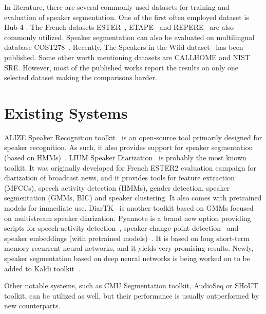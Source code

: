 \documentclass[FM,noheader,EN,bwtitles]{tulthesis}
\begin{document}
In literature, there are several commonly used datasets for training and evaluation of speaker segmentation.
One of the first often employed dataset is Hub-4 \parencite{hub-4}.
The French datasets ESTER~\parencite{DBLP:conf/lrec/GallianoGGBMC06}, ETAPE~\parencite{DBLP:conf/lrec/GalibertLACG14} and REPERE~\parencite{DBLP:conf/interspeech/Galibert13} are also commonly utilized.
Speaker segmentation can also be evaluated on multilingual database COST278~\parencite{DBLP:conf/interspeech/ZibertMMMNFGDZPCZKTV05}.
Recently, The Speakers in the Wild dataset~\parencite{DBLP:conf/interspeech/McLarenFCL16} has been published.
Some other worth mentioning datasets are CALLHOME and NIST SRE.
However, most of the published works report the results on only one selected dataset making the comparisons harder.

\section{Existing Systems}
\label{s:existingSystems}

ALIZE Speaker Recognition toolkit~\parencite{DBLP:conf/icassp/BonastreWM05, DBLP:conf/interspeech/LarcherBFLLLMP13} is an open-source tool primarily designed for speaker recognition.
As such, it also provides support for speaker segmentation (based on HMMs)~\parencite{DBLP:conf/icassp/BozonnetEF10}.
LIUM Speaker Diarization~\parencite{Meignier10liumspkdiarization:, DBLP:conf/interspeech/RouvierDGKMM13} is probably the most known toolkit.
It was originally developed for French ESTER2 evaluation campaign for diarization of broadcast news, and it provides tools for feature extraction (MFCCs), speech activity detection (HMMs), gender detection, speaker segmentation (GMMs, BIC) and speaker clustering.
It also comes with pretrained models for immediate use.
DiarTK~\parencite{DBLP:conf/interspeech/VijayasenanV12} is another toolkit based on GMMs focused on multistream speaker diarization.
Pyannote is a brand new option providing scripts for speech activity detection~\parencite{Yin2017}, speaker change point detection~\parencite{Yin2017} and speaker embeddings (with pretrained models)~\parencite{DBLP:conf/icassp/Bredin17}.
It is based on long short-term memory recurrent neural networks, and it yields very promising results.
Newly, speaker segmentation based on deep neural networks is being worked on to be added to Kaldi toolkit~\parencite{Povey_ASRU2011}.

Other notable systems, such as CMU Segmentation toolkit, AudioSeq or SHoUT toolkit, can be utilized as well, but their performance is usually outperformed by new counterparts.
\end{document}
